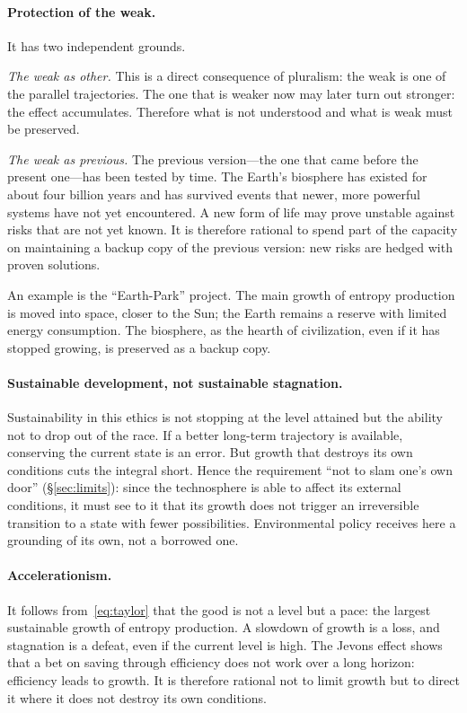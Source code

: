 \documentclass[11pt,a4paper]{article}
\newcommand{\Sref}[1]{\hyperref[#1]{\S\ref{#1}}}
\begin{document}
\paragraph{Protection of the weak.}
It has two independent grounds.

\emph{The weak as other.} This is a direct consequence of pluralism: the weak is one of the parallel trajectories. The one that is weaker now may later turn out stronger: the effect accumulates. Therefore what is not understood and what is weak must be preserved.

\emph{The weak as previous.} The previous version---the one that came before the present one---has been tested by time. The Earth's biosphere has existed for about four billion years and has survived events that newer, more powerful systems have not yet encountered. A new form of life may prove unstable against risks that are not yet known. It is therefore rational to spend part of the capacity on maintaining a backup copy of the previous version: new risks are hedged with proven solutions.

An example is the ``Earth-Park'' project. The main growth of entropy production is moved into space, closer to the Sun; the Earth remains a reserve with limited energy consumption. The biosphere, as the hearth of civilization, even if it has stopped growing, is preserved as a backup copy.

\paragraph{Sustainable development, not sustainable stagnation.}
Sustainability in this ethics is not stopping at the level attained but the ability not to drop out of the race. If a better long-term trajectory is available, conserving the current state is an error. But growth that destroys its own conditions cuts the integral short. Hence the requirement ``not to slam one's own door'' (\Sref{sec:limits}): since the technosphere is able to affect its external conditions, it must see to it that its growth does not trigger an irreversible transition to a state with fewer possibilities. Environmental policy receives here a grounding of its own, not a borrowed one.

\paragraph{Accelerationism.}
It follows from~\eqref{eq:taylor} that the good is not a level but a pace: the largest sustainable growth of entropy production. A slowdown of growth is a loss, and stagnation is a defeat, even if the current level is high. The Jevons effect shows that a bet on saving through efficiency does not work over a long horizon: efficiency leads to growth. It is therefore rational not to limit growth but to direct it where it does not destroy its own conditions.
\end{document}
